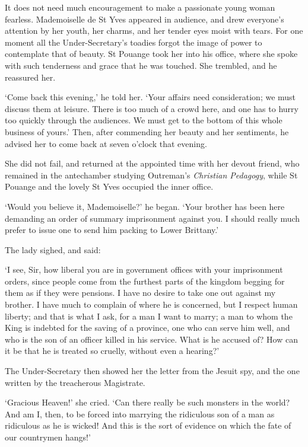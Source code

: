 \documentclass{article}
\begin{document}
\begin{center}
It does not need much encouragement to make a passionate young woman fearless. 
Mademoiselle de St Yves appeared in audience, and drew everyone's attention by 
her youth, her charms, and her tender eyes moist with tears. For one moment all 
the Under-Secretary's toadies forgot the image of power to contemplate that of 
beauty. St Pouange took her into his office, where she spoke with such tenderness 
and grace that he was touched. She trembled, and he reassured her. 

`Come back this evening,' he told her. `Your affairs need consideration; we must 
discuss them at leisure. There is too much of a crowd here, and one has to hurry 
too quickly through the audiences. We must get to the bottom of this whole business 
of yours.' Then, after commending her beauty and her sentiments, he advised her 
to come back at seven o'clock that evening. 

She did not fail, and returned at the appointed time with her devout friend, who 
remained in the antechamber studying Outreman's \textit{Christian Pedagogy}, while 
St Pouange and the lovely St Yves occupied the inner office. 

`Would you believe it, Mademoiselle?' he began. `Your brother has been here demanding 
an order of summary imprisonment against you. I should really much prefer to issue 
one to send him packing to Lower Brittany.' 

The lady sighed, and said: 

`I see, Sir, how liberal you are in government offices with your imprisonment orders, 
since people come from the furthest parts of the kingdom begging for them as if 
they were pensions. I have no desire to take one out against my brother. I have 
much to complain of where he is concerned, but I respect human liberty; and that 
is what I ask, for a man I want to marry; a man to whom the King is indebted for 
the saving of a province, one who can serve him well, and who is the son of an 
officer killed in his service. What is he accused of? How can it be that he is 
treated so cruelly, without even a hearing?' 

The Under-Secretary then showed her the letter from the Jesuit spy, and the one 
written by the treacherous Magistrate. 

`Gracious Heaven!' she cried. `Can there really be such monsters in the world? 
And am I, then, to be forced into marrying the ridiculous son of a man as ridiculous 
as he is wicked! And this is the sort of evidence on which the fate of our countrymen 
hangs!' 


\end{center}
\end{document}
